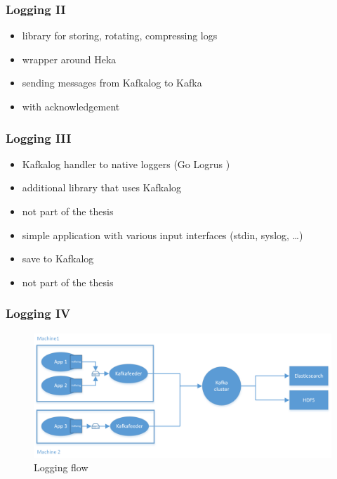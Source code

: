     \begin{frame}    
      \frametitle{Logging II}
          \begin{itemize}
            \item library for storing, rotating, compressing logs 
          \end{itemize}
          \begin{itemize}
            \item wrapper around Heka \cite{heka}
            \item sending messages from Kafkalog to Kafka \cite{kafka}
            \item with acknowledgement 
          \end{itemize} 
    \end{frame}        

    \begin{frame}
      \frametitle{Logging III}
          \begin{itemize}
            \item Kafkalog handler to native loggers (Go Logrus \cite{logrus})
          \end{itemize} 
          \begin{itemize}
            \item additional library that uses Kafkalog
            \item not part of the thesis
          \end{itemize}
          \begin{itemize}
            \item simple application with various input interfaces (stdin, syslog, \ldots) 
            \item save to Kafkalog
            \item not part of the thesis             
          \end{itemize}
    \end{frame}

    \begin{frame}    
      \frametitle{Logging IV}
      \begin{figure}[htb]
			  \begin{center}
				  \includegraphics[width=\textwidth]{img/logging-flow.png}
				  \caption{Logging flow}
			  \end{center}
		  \end{figure}
         
    \end{frame}   

